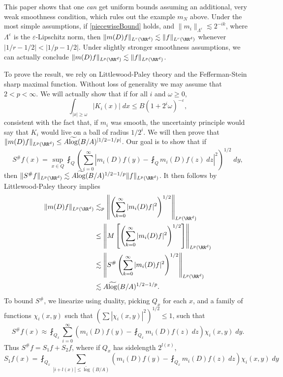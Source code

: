 This paper shows that one \emph{can} get uniform bounds assuming an additional, very weak smoothness condition, which rules out the example $m_N$ above. Under the most simple assumptions, if \eqref{piecewiseBound} holds, and $\| m_i \|_{\Lambda^\varepsilon} \lesssim 2^{-ik}$, where $\Lambda^\varepsilon$ is the $\varepsilon$-Lipschitz norm, then $\| m(D) f \|_{L^r(\RR^d)} \lesssim \| f \|_{L^r(\RR^d)}$ whenever $|1/r - 1/2| < |1/p - 1/2|$. Under slightly stronger smoothness assumptions, we can actually conclude $\| m(D) f \|_{L^p(\RR^d)} \lesssim \| f \|_{L^p(\RR^d)}$.

To prove the result, we rely on Littlewood-Paley theory and the Fefferman-Stein sharp maximal function. Without loss of generality we may assume that $2 < p < \infty$. We will actually show that if for all $i$ and $\omega \geq 0$,
%
\[ \int_{|x| \geq \omega} |K_i(x)|\; dx \leq B (1 + 2^i \omega)^{-\varepsilon}, \]
%
consistent with the fact that, if $m_i$ was smooth, the uncertainty principle would say that $K_i$ would live on a ball of radius $1/2^i$. We will then prove that $\| m(D) f \|_{L^p(\RR^d)} \leq A \widetilde{\log}(B/A)^{|1/2 - 1/p|}$. Our goal is to show that if
%
\[ S^\# f(x) = \sup_{x \in Q} \fint_Q \left( \sum_{i = 0}^\infty \left| m_i(D) f(y) - \fint_Q m_i(D) f(z)\; dz \right|^2 \right)^{1/2}\; dy, \]
%
then $\| S^\# f \|_{L^p(\RR^d)} \lesssim A \widetilde{\log}(B/A)^{1/2 - 1/p} \| f \|_{L^p(\RR^d)}$. It then follows by Littlewood-Paley theory implies
%
\begin{align*}
    \| m(D) f \|_{L^p(\RR^d)} &\lesssim_p \left\| \left( \sum_{k = 0}^\infty |m_i(D) f|^2 \right)^{1/2} \right\|_{L^p(\RR^d)}\\
    &\leq \left\| M \left[ \left( \sum_{k = 0}^\infty |m_i(D) f|^2 \right)^{1/2} \right] \right\|_{L^p(\RR^d)}\\
    &\lesssim \left\| S^\# \left( \sum_{k = 0}^\infty |m_i(D) f|^2 \right)^{1/2} \right\|_{L^p(\RR^d)}\\
    &\lesssim A \widetilde{\log}(B/A)^{1/2 - 1/p}.
\end{align*}
%
To bound $S^\#$, we linearize using duality, picking $Q_x$ for each $x$, and a family of functions $\chi_i(x,y)$ such that $\left( \sum |\chi_i(x,y)|^2 \right)^{1/2} \leq 1$, such that
%
\[ S^\# f(x) \approx \fint_{Q_x} \sum_{i = 0}^\infty \left( m_i(D) f(y) - \fint_{Q_x} m_i(D) f(z)\; dz \right) \chi_i(x,y)\; dy. \]
%
Thus $S^\# f = S_1 f + S_2 f$, where if $Q_x$ has sidelength $2^{l(x)}$,
%
\[ S_1 f(x) = \fint_{Q_x} \sum_{|i + l(x)| \leq \tilde\log(B/A)} \left( m_i(D) f(y) - \fint_{Q_x} m_i(D) f(z)\; dz \right) \chi_i(x,y)\; dy \]
